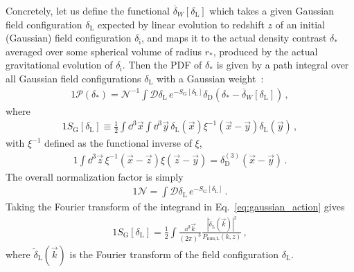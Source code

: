 \documentclass[prd,aps,10pt,nofootinbib,twocolumn,superscriptaddress,preprintnumbers,balancelastpage,longbibliography]{revtex4-1}
\begin{document}
Concretely, let us define the functional $\overline{\delta}_W[\delta_\text{L}]$ which takes a given Gaussian field configuration $\delta_\text{L}$ expected by linear evolution to redshift $z$ of an initial (Gaussian) field configuration $\delta_\text{i}$, and maps it to the actual density contrast $\delta_*$ averaged over some spherical volume of radius $r_*$, produced by the actual gravitational evolution of $\delta_\text{i}$.
Then the PDF of $\delta_*$ is given by a path integral over all Gaussian field configurations $\delta_\text{L}$ with a Gaussian weight~\cite{Valageas:2001zr}: 
%
\begin{alignat}{1}
    \mathcal{P}(\delta_*) = \mathcal{N}^{-1} \int \mathcal{D} \delta_\text{L} \, e^{-S_\text{G}[\delta_\text{L}]} \delta_\text{D}(\delta_* - \overline{\delta}_W[\delta_\text{L}]) \,,
    \label{eq:pdf_path_integral}
\end{alignat}
%
where
%
\begin{alignat}{1}
    S_\text{G}[\delta_\text{L}] \equiv \frac{1}{2} \int \dd^3 \vec{x} \int \dd^3 \vec{y} \, \delta_\text{L}(\vec{x}) \xi^{-1}(\vec{x} - \vec{y}) \delta_\text{L}(\vec{y}) \,,
    \label{eq:gaussian_action}
\end{alignat}
%
with $\xi^{-1}$ defined as the functional inverse of $\xi$,
%
\begin{alignat}{1}
    \int \dd^3 \vec{z} \, \xi^{-1}(\vec{x} - \vec{z}) \xi(\vec{z} - \vec{y}) = \delta^{(3)}_\text{D}(\vec{x} - \vec{y}) \,.
\end{alignat}
%
The overall normalization factor is simply
%
\begin{alignat}{1}
    \mathcal{N} = \int \mathcal{D}\delta_\text{L}\, e^{-S_\text{G}[\delta_\text{L}]} \,.
\end{alignat}
%
Taking the Fourier transform of the integrand in Eq.~\eqref{eq:gaussian_action} gives~\cite{Valageas:2001zr}
%
\begin{alignat}{1}
    S_\text{G}[\delta_\text{L}] = \frac{1}{2} \int \frac{\dd^3 \vec{k}}{(2\pi)^3} \frac{|\tilde{\delta}_\text{L}(\vec{k})|^2}{P_\text{mm,L}(k,z)} \,,
\end{alignat}
%
where $\tilde{\delta}_\text{L}(\vec{k})$ is the Fourier transform of the field configuration $\delta_\text{L}$. 
\end{document}
